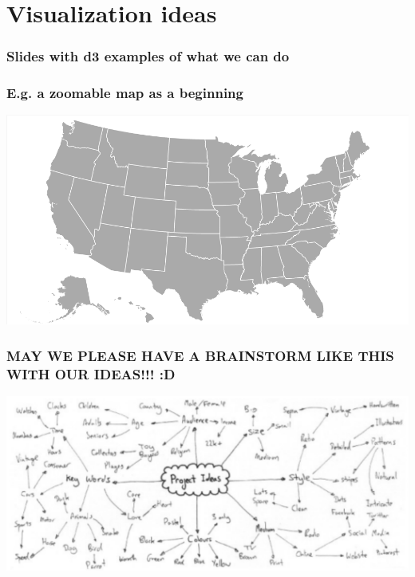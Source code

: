
\section{Visualization ideas}

  \begin{frame}
    \frametitle{Slides with d3 examples of what we can do}


  \end{frame}


  \begin{frame}
    \frametitle{E.g. a zoomable map as a beginning}
    
    \includegraphics[width=\textwidth]{Figures/zoomable_map.png}


  \end{frame}


  \begin{frame}
    \frametitle{MAY WE PLEASE HAVE A BRAINSTORM LIKE THIS WITH OUR IDEAS!!! :D }
    
    \includegraphics[width=\textwidth]{Figures/project_ideas.png}


  \end{frame}


